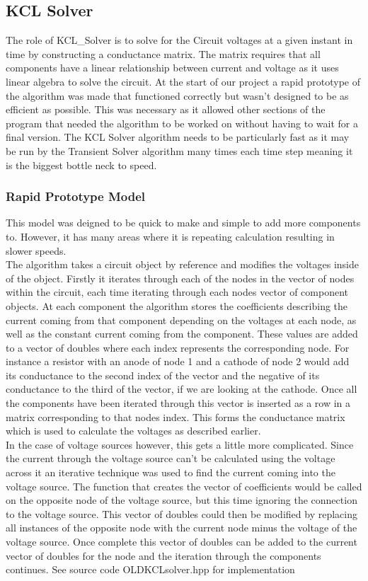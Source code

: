 \documentclass{article}
\begin{document}
\subsection{KCL Solver}\label{KCLsolver}
The role of KCL\_Solver is to solve for the Circuit voltages at a given instant in time by constructing a conductance matrix. The matrix requires that all components have a linear relationship between current and voltage as it uses linear algebra to solve the circuit. At the start of our project a rapid prototype of the algorithm was made that functioned correctly but wasn't designed to be as efficient as possible. This was necessary as it allowed other sections of the program that needed the algorithm to be worked on without having to wait for a final version. The KCL Solver algorithm needs to be particularly fast as it may be run by the Transient Solver algorithm many times each time step meaning it is the biggest bottle neck to speed.
\subsubsection{Rapid Prototype Model}
This model was deigned to be quick to make and simple to add more components to. However, it has many areas where it is repeating calculation resulting in slower speeds.\\ The algorithm takes a circuit object by reference and modifies the voltages inside of the object. Firstly it iterates through each of the nodes in the vector of nodes within the circuit, each time iterating through each nodes vector of component objects. At each component the algorithm stores the coefficients describing the current coming from that component depending on the voltages at each node, as well as the constant current coming from the component. These values are added to a vector of doubles where each index represents the corresponding node. For instance a resistor with an anode of node 1 and a cathode of node 2 would add its conductance to the second index of the vector and the negative of its conductance to the third of the vector, if we are looking at the cathode. Once all the components have been iterated through this vector is inserted as a row in a matrix corresponding to that nodes index. This forms the conductance matrix which is used to calculate the voltages as described earlier.\\
In the case of voltage sources however, this gets a little more complicated. Since the current through the voltage source can't be calculated using the voltage across it an iterative technique was used to find the current coming into the voltage source. The function that creates the vector of coefficients would be called on the opposite node of the voltage source, but this time ignoring the connection to the voltage source. This vector of doubles could then be modified by replacing all instances of the opposite node with the current node minus the voltage of the voltage source. Once complete this vector of doubles can be added to the current vector of doubles for the node and the iteration through the components continues. 
\bigbreak
See source code OLDKCLsolver.hpp for implementation
\newpage
\end{document}
